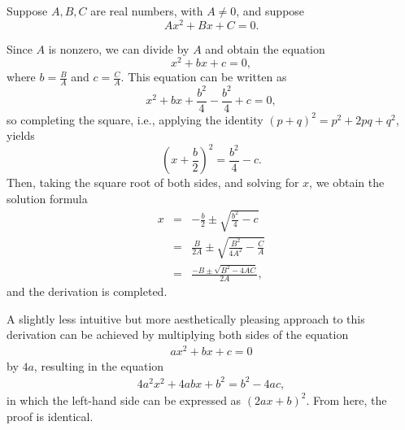 \documentclass{article}
\begin{document}
Suppose $A,B,C$ are real numbers, with $A\neq 0$, and suppose
 \[Ax^2+Bx+C=0.\]

Since $A$ is nonzero, we can divide by $A$ and obtain the equation
\[
x^2 + bx+c = 0,
\]
where $b=\frac{B}{A}$ and $c=\frac{C}{A}$.  
This equation can be written as
$$x^2 + bx + \frac{b^2}{4} -\frac{b^2}{4} +c =0,$$
so completing the square, i.e., applying the identity $(p+q)^2=p^2+2pq + q^2$, yields
$$\left(x+\frac{b}{2}\right)^2 = \frac{b^2}{4} - c.$$
Then, taking the square root of both sides, and solving for $x$, we obtain 
the solution formula
\begin{eqnarray*}
x &=& -\frac{b}{2} \pm \sqrt{\frac{b^2}{4}-c}\nonumber\\
 &=& \frac{B}{2A} \pm \sqrt{\frac{B^2}{4A^2}-\frac{C}{A}}\nonumber\\
 &=& \frac{-B\pm\sqrt{B^2-4AC}}{2A},
\end{eqnarray*}
and the derivation is completed.

A slightly less intuitive but more aesthetically pleasing approach to this derivation can be achieved by multiplying both sides of the equation
\begin{align*}
ax^2+bx+c=0
\end{align*}
by $4a$, resulting in the equation
\begin{align*}
4a^2x^2+4abx+b^2=b^2-4ac,
\end{align*}
in which the left-hand side can be expressed as $(2ax+b)^2$.  From here, the proof is identical.
\end{document}
